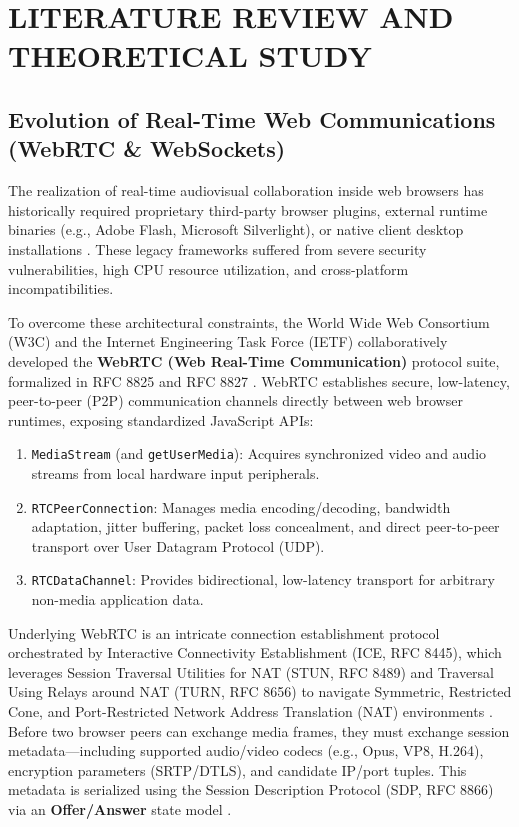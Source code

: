 \documentclass[12pt,oneside,letterpaper]{report}
\numberwithin{equation}{chapter} %
\begin{document}
\chapter{LITERATURE REVIEW AND THEORETICAL STUDY}

\section{Evolution of Real-Time Web Communications (WebRTC \& WebSockets)}
The realization of real-time audiovisual collaboration inside web browsers has historically required proprietary third-party browser plugins, external runtime binaries (e.g., Adobe Flash, Microsoft Silverlight), or native client desktop installations \cite{johnston2020security}. These legacy frameworks suffered from severe security vulnerabilities, high CPU resource utilization, and cross-platform incompatibilities.

To overcome these architectural constraints, the World Wide Web Consortium (W3C) and the Internet Engineering Task Force (IETF) collaboratively developed the \textbf{WebRTC (Web Real-Time Communication)} protocol suite, formalized in RFC 8825 and RFC 8827 \cite{aboba2021webrtc}. WebRTC establishes secure, low-latency, peer-to-peer (P2P) communication channels directly between web browser runtimes, exposing standardized JavaScript APIs:
\begin{enumerate}
    \item \texttt{MediaStream} (and \texttt{getUserMedia}): Acquires synchronized video and audio streams from local hardware input peripherals.
    \item \texttt{RTCPeerConnection}: Manages media encoding/decoding, bandwidth adaptation, jitter buffering, packet loss concealment, and direct peer-to-peer transport over User Datagram Protocol (UDP).
    \item \texttt{RTCDataChannel}: Provides bidirectional, low-latency transport for arbitrary non-media application data.
\end{enumerate}

Underlying WebRTC is an intricate connection establishment protocol orchestrated by Interactive Connectivity Establishment (ICE, RFC 8445), which leverages Session Traversal Utilities for NAT (STUN, RFC 8489) and Traversal Using Relays around NAT (TURN, RFC 8656) to navigate Symmetric, Restricted Cone, and Port-Restricted Network Address Translation (NAT) environments \cite{mahy2020traversal}. Before two browser peers can exchange media frames, they must exchange session metadata---including supported audio/video codecs (e.g., Opus, VP8, H.264), encryption parameters (SRTP/DTLS), and candidate IP/port tuples. This metadata is serialized using the Session Description Protocol (SDP, RFC 8866) via an \textbf{Offer/Answer} state model \cite{handley2021sdp}.
\end{document}
